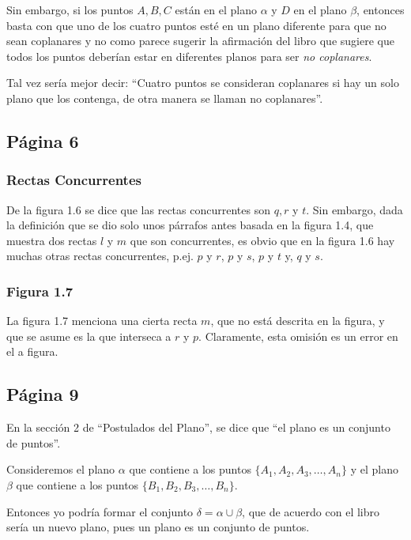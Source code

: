 Sin embargo, si los puntos \(A,B,C\) están en el plano \(\alpha\) y \(D\) en el plano  \(\beta\), entonces basta con que uno de los cuatro puntos esté en un plano diferente para que no sean coplanares y no como parece sugerir la afirmación del libro que sugiere que todos los puntos deberían estar en diferentes planos para ser \textit{no coplanares}.

Tal vez sería mejor decir: ``Cuatro puntos se consideran coplanares si hay un solo plano que los contenga, de otra manera se llaman no coplanares''.

\subsection{Página 6}

\subsubsection{Rectas Concurrentes}

De la figura 1.6 se dice que las rectas concurrentes son $q,r$ y $t$. Sin embargo, dada la definición que se dio solo unos párrafos antes basada en la figura 1.4, que muestra dos rectas $l$ y $m$ que son concurrentes, es obvio que en la figura 1.6 hay muchas otras rectas concurrentes, p.ej. $p$ y $r$, $p$ y $s$, $p$ y $t$ y, $q$ y $s$.

\subsubsection{Figura 1.7}

La figura 1.7 menciona una cierta recta $m$, que no está descrita en la figura, y que se asume es la que interseca a $r$ y $p$. Claramente, esta omisión es un error en el a figura.

\subsection{Página 9}

En la sección 2 de ``Postulados del Plano'', se dice que ``el plano es un conjunto de puntos''.

Consideremos el plano \(\alpha\) que contiene a los puntos \(\{A_1,A_2,A_3,\dots,A_n\}\) y el plano \(\beta\) que contiene a los puntos \(\{B_1,B_2,B_3,\dots,B_n\}\).

Entonces yo podría formar el conjunto \(\delta = \alpha \cup \beta\), que de acuerdo con el libro sería un nuevo plano, pues un plano es un conjunto de puntos.

